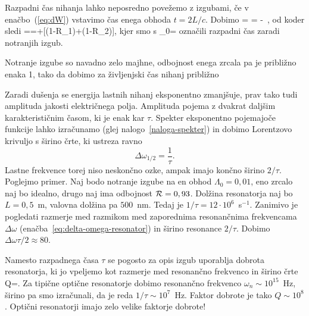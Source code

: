 Razpadni čas nihanja lahko neposredno povežemo z izgubami, če v enačbo~(\ref{eq:dW})
vstavimo čas enega obhoda $t=2L/c$. Dobimo
\beq
{}= \Lambda = -\, ,
\eeq
od koder sledi
\beq
{}==+[(1-{\cal R}_{1})+(1-{\cal R}_{2})],
\label{taulambda}
\eeq
kjer smo s 
\beq
\tau_{0}=
\eeq
označili razpadni čas zaradi notranjih izgub. 

Notranje izgube so navadno zelo majhne, odbojnost enega zrcala
pa je približno enaka 1, tako da dobimo za življenjski čas nihanj približno

Zaradi dušenja se energija lastnih nihanj eksponentno zmanjšuje, prav tako tudi
amplituda jakosti električnega polja. Amplituda pojema z dvakrat daljšim 
karakterističnim časom, ki je enak kar $\tau$. Spekter eksponentno pojemajoče funkcije lahko izračunamo
(glej nalogo~\ref{naloga-spekter}) in dobimo Lorentzovo krivuljo s širino črte, ki ustreza ravno
\begin{equation}
\Delta\omega_{1/2}=\frac{1}{\tau}.
\label{3.26}
\end{equation}
Lastne frekvence torej niso neskončno ozke, ampak imajo končno širino $2/\tau$.
Poglejmo primer. Naj bodo notranje izgube na en obhod $\Lambda_0=0,01$,
eno zrcalo naj bo idealno, drugo naj ima odbojnost ${\cal R}=0,93$. Dolžina
resonatorja naj bo $L=0,5$~m, valovna dolžina pa $500$~nm. Tedaj
je $1/\tau=12\cdot10^{6}$~s$^{-1}$. Zanimivo je pogledati razmerje med 
razmikom med zaporednima resonančnima frekvencama $\Delta \omega$ 
(enačba~\ref{eq:delta-omega-resonator}) in širino resonance $2/\tau$. 
Dobimo $\Delta\omega\tau/2 \approx 80$.

\begin{remark}
Namesto razpadnega časa $\tau$ se pogosto za opis izgub uporablja
dobrota resonatorja, ki jo vpeljemo kot
razmerje med resonančno frekvenco in širino črte 
\beq
Q=.
\eeq
Za tipične optične resonatorje dobimo resonančno 
frekvenco $\omega_n \sim 10^{15}$~Hz, širino pa smo izračunali, da je reda 
 $1/\tau \sim 10^{7}$~Hz. Faktor dobrote je tako $Q \sim 10^{8}$. Optični 
 resonatorji imajo zelo velike faktorje dobrote!
\end{remark}

